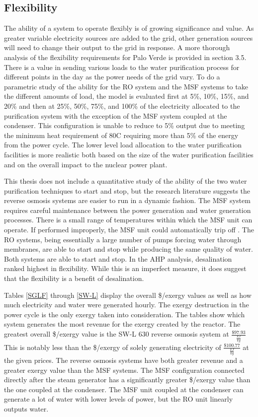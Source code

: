 \subsection{Flexibility}
The ability of a system to operate flexibly is of growing significance and value. As greater variable electricity sources are added to the grid, other generation sources will need to change their output to the grid in response. A more thorough analysis of the flexibility requirements for Palo Verde is provided in section 3.5. There is a value in sending various loads to the water purification process for different points in the day as the power needs of the grid vary. To do a parametric study of the ability for the RO system and the MSF systems to take the different amounts of load, the model is evaluated first at 5\%, 10\%, 15\%, and 20\% and then at 25\%, 50\%, 75\%, and 100\% of the electricity allocated to the purification system with the exception of the MSF system coupled at the condenser. This configuration is unable to reduce to 5\% output due to meeting the minimum heat requirement of 80\degree C requiring more than 5\% of the energy from the power cycle. The lower level load allocation to the water purification facilities is more realistic both based on the size of the water purification facilities and on the overall impact to the nuclear power plant.

This thesis does not include a quantitative study of the ability of the two water purification techniques to start and stop, but the research literature suggests the reverse osmosis systems are easier to run in a dynamic fashion.  The MSF system requires careful maintenance between the power generation and water generation processes.  There is a small range of temperatures within which the MSF unit can operate.  If performed improperly, the MSF unit could automatically trip off \cite{Radif}.  The RO systems, being essentially a large number of pumps forcing water through membranes, are able to start and stop while producing the same quality of water.  Both systems are able to start and stop.  In the AHP analysis, desalination ranked highest in flexibility. While this is an imperfect measure, it does suggest that the flexibility is a benefit of desalination.

Tables \ref{SGLF} through \ref{SW-L} display the overall \$/exergy values as well as how much electricity and water were generated hourly. The exergy destruction in the power cycle is the only exergy taken into consideration. The tables show which system generates the most revenue for the exergy created by the reactor.  The greatest overall  \$/exergy value is the SW-L 630  reverse osmosis system at $\frac{\$97.93}{\frac{kJ}{kg}}$  This is notably less than the \$/exergy of solely generating electricity of $\frac{\$100.77}{\frac{kJ}{kg}}$ at the given prices. The reverse osmosis systems have both greater revenue and a greater exergy value than the MSF systems.  The MSF configuration connected directly after the steam generator has a significantly greater \$/exergy value than the one coupled at the condenser. The MSF unit coupled at the condenser can generate a lot of water with lower levels of power, but the RO unit linearly outputs water.

